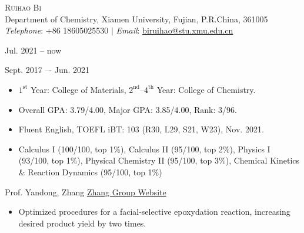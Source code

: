 \pagestyle{plain}
\thispagestyle{empty} %
{\begin{center}
\Large{\textsc{Ruihao Bi}} \\ \normalsize {Department of Chemistry, Xiamen University, Fujian, P.R.China, 361005} \\ \textit{Telephone}: {+86 18605025530} $|$ \textit{Email}: {\href{mailto:biruihao@stu.xmu.edu.cn}{biruihao@stu.xmu.edu.cn}} 
\end{center}}

\sectionrule
{}

{ \hfill {Jul. 2021 -- now}}

{ \hfill {Sept. 2017 –- Jun. 2021}}

\begin{itemize}
\item $\mathrm{1^{st}}$ Year: College of Materials, $\mathrm{2^{nd}}$--$\mathrm{4^{th}}$ Year:	College of Chemistry.
\item Overall GPA: 3.79/4.00, Major GPA: 3.85/4.00, Rank: 3/96.
\item Fluent English, TOEFL iBT: 103 (R30, L29, S21, W23), Nov. 2021.
\end{itemize}



\noindent{}
\begin{itemize}

\item Calculus I (100/100, top 1\%), Calculus II (95/100, top 2\%), Physics I (93/100, top 1\%), Physical Chemistry II (95/100, top 3\%), Chemical Kinetics \& Reaction Dynamics (95/100, top 1\%)
\end{itemize}

\vspace{5mm}
\sectionrule
{}


{\noindent Prof. Yandong, Zhang  \hfill \href{https://zhanglab.xmu.edu.cn/}{Zhang Group Website}}


\begin{itemize}
\item{Optimized procedures for a facial-selective epoxydation reaction, increasing desired product yield by two times.}
\end{itemize}

